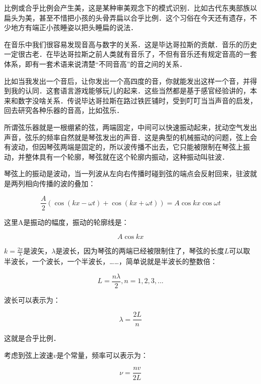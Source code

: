 比例或合乎比例会产生美，这是某种审美观念下的模式识别．比如古代东夷部族以扁头为美，甚至不惜把小孩的头骨弄扁以合乎比例．这个习俗在今天还有遗存，不少地方有端正小孩睡姿以把头睡扁的说法．

在音乐中我们很容易发现音高与数字的关系．这是毕达哥拉斯的贡献．音乐的历史一定很古老．在毕达哥拉斯之前人类就有音乐了，不但有音乐还有规定音高的一套体系，即有一套术语来说清楚“不同音高”的音之间的关系．

比如当我发出一个音后，让你发出一个高四度的音，你就能发出这样一个音，并得到我的认同．这套语言游戏能够玩儿的起来．这些当然都是基于感官经验讲的，本来和数字没啥关系．传说毕达哥拉斯在路过铁匠铺时，受到叮叮当当声音的启发，回去研究各种乐器的音高，比如弦乐．

所谓弦乐器就是一根绷紧的弦，两端固定，中间可以快速振动起来，扰动空气发出声音，弦乐的频率自然就是琴弦发出的声音．这是典型的机械振动的问题，弦上会有波动，但因琴弦两端是固定的，所以波传播不出去，它只能被限制在琴弦上振动，并整体具有一个轮廓，琴弦就在这个轮廓内振动，这种振动叫驻波．

琴弦上的振动是波动，当一列波从左向右传播时碰到弦的端点会反射回来，驻波就是两列相向传播的波的叠加：

\begin{equation}
\frac{A}{2} \left( \cos ( kx - \omega t ) + \cos ( kx + \omega t ) \right) = A \cos kx \cos \omega t
\end{equation}

这里A是振动的幅度，振动的轮廓线是：

\begin{equation}
A \cos kx 
\end{equation}

$k = \frac{2 \pi}{\lambda}$是波矢，$\lambda$是波长，因为琴弦的两端已经被限制住了，琴弦的长度$L$可以取半波长，一个波长，一个半波长，……，简单说就是半波长的整数倍：

\begin{equation}
L = \frac{n \lambda}{2}, n = 1, 2, 3, ...
\end{equation}

波长可以表示为：

\begin{equation}
\lambda = \frac{2L}{n}
\end{equation}

这就是合乎比例．

考虑到弦上波速$v$是个常量，频率可以表示为：

\begin{equation}
\nu = \frac{n v}{2 L }
\end{equation}

